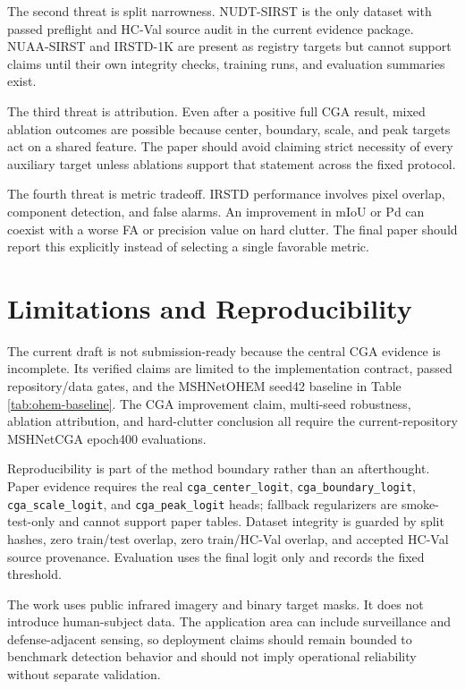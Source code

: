 \documentclass[letterpaper]{article}
\begin{document}
The second threat is split narrowness. NUDT-SIRST is the only dataset with passed preflight and HC-Val source audit in the current evidence package. NUAA-SIRST and IRSTD-1K are present as registry targets but cannot support claims until their own integrity checks, training runs, and evaluation summaries exist.

The third threat is attribution. Even after a positive full CGA result, mixed ablation outcomes are possible because center, boundary, scale, and peak targets act on a shared feature. The paper should avoid claiming strict necessity of every auxiliary target unless ablations support that statement across the fixed protocol.

The fourth threat is metric tradeoff. IRSTD performance involves pixel overlap, component detection, and false alarms. An improvement in mIoU or Pd can coexist with a worse FA or precision value on hard clutter. The final paper should report this explicitly instead of selecting a single favorable metric.

\section{Limitations and Reproducibility}

The current draft is not submission-ready because the central CGA evidence is incomplete. Its verified claims are limited to the implementation contract, passed repository/data gates, and the MSHNetOHEM seed42 baseline in Table \ref{tab:ohem-baseline}. The CGA improvement claim, multi-seed robustness, ablation attribution, and hard-clutter conclusion all require the current-repository MSHNetCGA epoch400 evaluations.

Reproducibility is part of the method boundary rather than an afterthought. Paper evidence requires the real \texttt{cga\_center\_logit}, \texttt{cga\_boundary\_logit}, \texttt{cga\_scale\_logit}, and \texttt{cga\_peak\_logit} heads; fallback regularizers are smoke-test-only and cannot support paper tables. Dataset integrity is guarded by split hashes, zero train/test overlap, zero train/HC-Val overlap, and accepted HC-Val source provenance. Evaluation uses the final logit only and records the fixed threshold.

The work uses public infrared imagery and binary target masks. It does not introduce human-subject data. The application area can include surveillance and defense-adjacent sensing, so deployment claims should remain bounded to benchmark detection behavior and should not imply operational reliability without separate validation.
\end{document}
